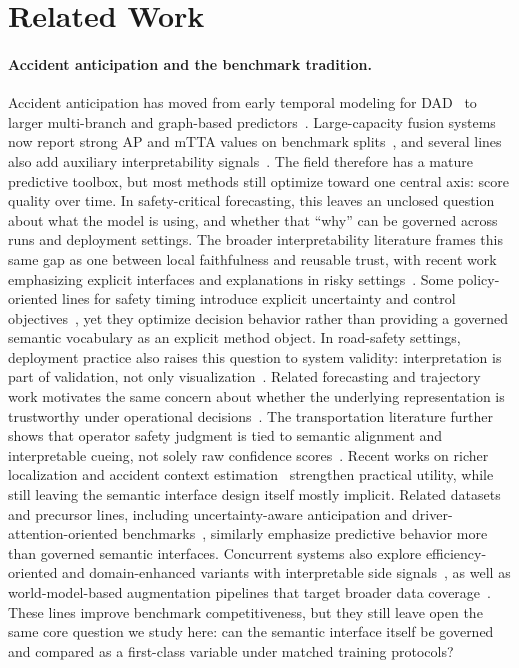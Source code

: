 \section{Related Work}
\label{sec:related}

\paragraph{Accident anticipation and the benchmark tradition.}
Accident anticipation has moved from early temporal modeling for DAD~\citep{ref4} to larger multi-branch and graph-based predictors~\citep{ref45,ref17,ref32,ref36,ref37,ref208}. Large-capacity fusion systems now report strong AP and mTTA values on benchmark splits~\citep{liao2024crash,liu2025ccaf,ZHANG2025103173}, and several lines also add auxiliary interpretability signals~\citep{ref2,ref102}. The field therefore has a mature predictive toolbox, but most methods still optimize toward one central axis: score quality over time. In safety-critical forecasting, this leaves an unclosed question about what the model is using, and whether that ``why'' can be governed across runs and deployment settings.
The broader interpretability literature frames this same gap as one between local
faithfulness and reusable trust, with recent work emphasizing explicit interfaces
and explanations in risky settings~\citep{ribeiro2016loco,lundberg2017unified,doshi2017towards,rudin2019stop}. Some policy-oriented lines for safety timing introduce explicit uncertainty and control objectives~\citep{osband2016bootstrapped,konda1999actor}, yet they optimize decision behavior rather than providing a governed semantic vocabulary as an explicit method object.
In road-safety settings, deployment practice also raises this question to system
validity: interpretation is part of validation, not only visualization~\citep{who2023global,NHTSA2023}.
Related forecasting and trajectory work motivates the same concern about whether the
underlying representation is trustworthy under operational decisions~\citep{liao2024cognitive,ref13,ref23}.
The transportation literature further shows that operator safety judgment is tied to
semantic alignment and interpretable cueing, not solely raw confidence scores~\citep{kim2025understanding,guan2025experimental}.
Recent works on richer localization and accident context estimation~\citep{ref100,wang2024deepaccident} strengthen practical utility, while still leaving the semantic interface design itself mostly implicit.
Related datasets and precursor lines, including uncertainty-aware anticipation
and driver-attention-oriented benchmarks~\citep{ref1,ref33,fang2021dada,karim2023attention},
similarly emphasize predictive behavior more than governed semantic interfaces.
Concurrent systems also explore efficiency-oriented and domain-enhanced variants
with interpretable side signals~\citep{song2025rare,guan2025domain,liu2025predictresist},
as well as world-model-based augmentation pipelines that target broader data
coverage~\citep{guan2025worldmodel}. These lines improve benchmark competitiveness,
but they still leave open the same core question we study here: can the
semantic interface itself be governed and compared as a first-class variable
under matched training protocols?

